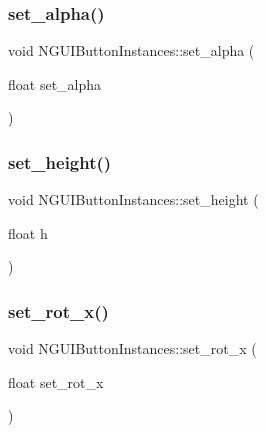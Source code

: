 \hypertarget{class_n_g_u_i_button_instances_a06b15ff15b08086acb07f962e130aef1}{}\label{class_n_g_u_i_button_instances_a06b15ff15b08086acb07f962e130aef1} 
\subsubsection{\texorpdfstring{set\+\_\+alpha()}{set\_alpha()}}
{\footnotesize\ttfamily void N\+G\+U\+I\+Button\+Instances\+::set\+\_\+alpha (\begin{DoxyParamCaption}\item[{float}]{set\+\_\+alpha }\end{DoxyParamCaption})}

\hypertarget{class_n_g_u_i_button_instances_a27c6fe167e34c7ada1238ba2ff275a32}{}\label{class_n_g_u_i_button_instances_a27c6fe167e34c7ada1238ba2ff275a32} 
\subsubsection{\texorpdfstring{set\+\_\+height()}{set\_height()}}
{\footnotesize\ttfamily void N\+G\+U\+I\+Button\+Instances\+::set\+\_\+height (\begin{DoxyParamCaption}\item[{float}]{h }\end{DoxyParamCaption})}

\hypertarget{class_n_g_u_i_button_instances_ae2d848bdadde47f15a9f1357b0c2a3ec}{}\label{class_n_g_u_i_button_instances_ae2d848bdadde47f15a9f1357b0c2a3ec} 
\subsubsection{\texorpdfstring{set\+\_\+rot\+\_\+x()}{set\_rot\_x()}}
{\footnotesize\ttfamily void N\+G\+U\+I\+Button\+Instances\+::set\+\_\+rot\+\_\+x (\begin{DoxyParamCaption}\item[{float}]{set\+\_\+rot\+\_\+x }\end{DoxyParamCaption})}

